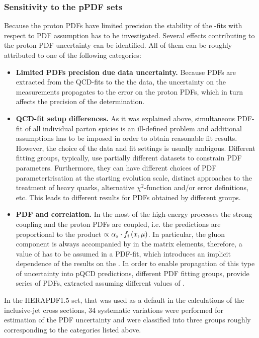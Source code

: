 \subsubsection{Sensitivity to the pPDF sets}
\label{subsec:aspdfassump}
Because the proton PDFs have limited precision the stability of the \asz-fits with respect to PDF assumption has to be investigated. Several effects contributing to the proton PDF uncertainty can be identified. All of them can be roughly attributed to one of the following categories:
\begin{itemize}
 \item \textbf{Limited PDFs precision due data uncertainty.} Because PDFs are extracted from the QCD-fits to the the data, the uncertainty on the measurements propagates to the error on the proton PDFs, which in turn affects the precision of the \asz determination.
 \item \textbf{QCD-fit setup differences.} As it was explained above, simultaneous PDF-fit of all individual parton spicies is an ill-defined problem and additional assumptions has to be imposed in order to obtain reasonable fit results. However, the choice of the data and fit settings is usually ambigous. Different fitting groups, typically, use partially different datasets to constrain PDF parameters. Furthermore, they can have different choices of PDF parametertrisation at the starting evolution scale, distinct approaches to the treatment of heavy quarks, alternative $\chi^2$-function and/or error definitions, etc. This leads to different results for PDFs obtained by different groups.
 \item \textbf{PDF and \asz correlation.} In the most of the high-energy processes the strong coupling and the proton PDFs are coupled, i.e. the predictions are proportional to the product $\propto \mbox{$\alpha_{s}$}\cdot f_i\left(x,\mu\right)$. In particular, the gluon component is always accompanied by \as in the matrix elements, therefore, a value of \asz has to be assumed in a PDF-fit, which introduces an implicit dependence of the results on the \asz. In order to enable propagation of this type of uncertainty into pQCD predictions, different PDF fitting groups, provide series of PDFs, extracted assuming different values of \asz.
\end{itemize}

In the HERAPDF1.5 set, that was used as a default in the calculations of the inclusive-jet cross sections, 34 systematic variations were performed for estimation of the PDF uncertainty and were classified into three groups roughly corresponding to the categories listed above. 

